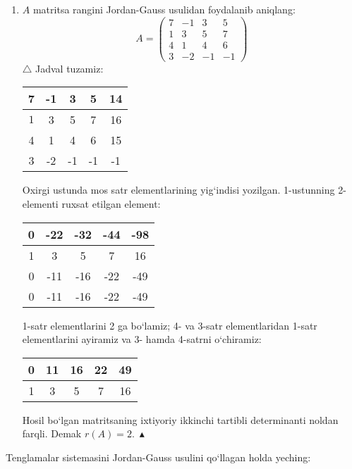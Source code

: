 \begin{enumerate}
\item $A$ matritsa rangini Jordan-Gauss usulidan foydalanib aniqlang:
$$A=\begin{pmatrix}
	7&-1&3&5\\ 
	1&3&5&7\\
	4&1&4&6\\
	3&-2&-1&-1
\end{pmatrix}$$
$\triangle$ Jadval tuzamiz:
\begin{center}
	\begin{tabular}{|c|c|c|c|c|}
		\hline
		7&-1&3&5&14\\ \hline
		$\boxed{1}$&3&5&7&16\\ \hline
		4&1&4&6&15\\ \hline
		3&-2&-1&-1&-1\\ \hline
	\end{tabular}
\end{center}
Oxirgi ustunda mos satr elementlarining yig`indisi yozilgan. 1-ustunning 2-elementi ruxsat etilgan element:
\begin{center}
	\begin{tabular}{|c|c|c|c|c|}
		\hline
		0&-22&-32&-44&-98\\ \hline
		1&3&5&7&16\\ \hline
		0&-11&-16&-22&-49\\ \hline
		0&-11&-16&-22&-49\\ \hline
	\end{tabular}
\end{center}
1-satr elementlarini 2 ga bo`lamiz; 4- va 3-satr elementlaridan 1-satr elementlarini ayiramiz va 3- hamda 4-satrni o`chiramiz:
\begin{center}
	\begin{tabular}{|c|c|c|c|c|}
		\hline
		0&11&16&22&49\\ \hline
		1&3&5&7&16\\ \hline
	\end{tabular}
\end{center}
Hosil bo`lgan matritsaning ixtiyoriy ikkinchi tartibli determinanti noldan farqli. Demak $r(A)=2.\ \blacktriangle$
\end{enumerate}
Tenglamalar sistemasini Jordan-Gauss usulini qo`llagan holda yeching:
